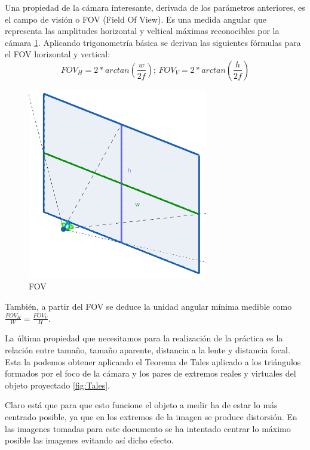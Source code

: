 \documentclass[12pt]{article}
\begin{document}
Una propiedad de la cámara interesante, derivada de los parámetros anteriores, es el campo de visión o FOV (Field Of View). 
Es una medida angular que representa las amplitudes horizontal y veltical máximas reconocibles por la cámara \ref{fig:Modelo_fov}.
Aplicando trigonometría básica se derivan las siguientes fórmulas para el FOV horizontal y vertical:
$$ FOV_H = 2*arctan \left( \frac{w}{2f} \right) \text{;     } FOV_V = 2*arctan \left( \frac{h}{2f} \right)$$ 
\begin{figure}[h!]
    \centering
    \includegraphics[width=0.7\textwidth]{images_calibracion/Modelo_fov.png}  %
    \caption{FOV}
    \label{fig:Modelo_fov}
\end{figure}
También, a partir del FOV se deduce la unidad angular mínima medible como $\frac{FOV_H}{W} = \frac{FOV_V}{H}$.

La última propiedad que necesitamos para la realización de la práctica es la relación entre tamaño, tamaño aparente, distancia a la lente y distancia focal.
Esta la podemos obtener aplicando el Teorema de Tales aplicado a los triángulos formados por el foco de la cámara y los pares de extremos reales y virtuales del objeto proyectado \ref{fig:Tales}. 

Claro está que para que esto funcione el objeto a medir ha de estar lo más centrado posible, ya que en los extremos de la imagen se produce distorsión. En las imagenes tomadas para este documento se ha intentado centrar lo máximo posible las imagenes evitando así dicho efecto.
\end{document}
